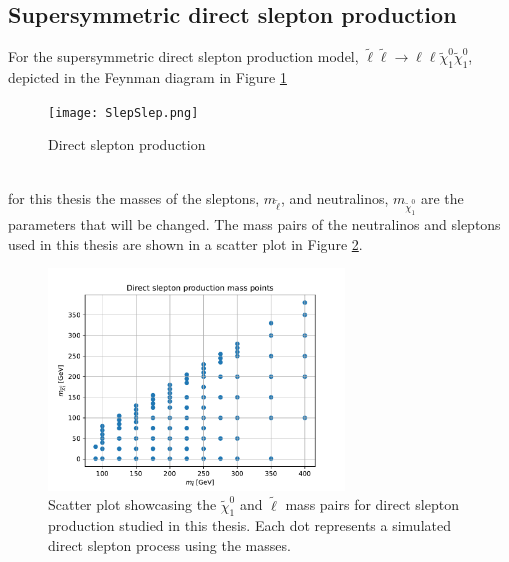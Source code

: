 \documentclass[12pt, a4paper]{book}
\begin{document}
\subsection{Supersymmetric direct slepton production}
For the supersymmetric direct slepton production model, $\tilde{\ell}\tilde{\ell}\rightarrow \ell\ell\tilde{\chi}_1^0\tilde{\chi}_1^0$, depicted in the Feynman diagram in Figure \ref{fig:designer_got_me_slepslep}
\begin{figure}[!h]
    \centering
    \texttt{[image: SlepSlep.png]}
    \caption{Direct slepton production}\label{fig:designer_got_me_slepslep}
\end{figure}
\\for this thesis the masses of the sleptons, $m_{\tilde{\ell}}$, and neutralinos, $m_{\tilde{\chi}_1^0}$ are the parameters that will be changed. 
The mass pairs of the neutralinos and sleptons used in this thesis are shown in a scatter plot in Figure \ref{fig:slepslep_mass}.
\graphicspath{{../../../Plots/2d_masses/}}
\begin{figure}[!ht]
    \centering
    \includegraphics[width=0.7\textwidth]{SlepSlep.pdf}
    \caption[$\tilde{\chi}_1^0$ and $\tilde{\ell}$ mass pairs for direct slepton production]{Scatter plot showcasing the $\tilde{\chi}_1^0$ and $\tilde{\ell}$ mass pairs for direct slepton production studied in this thesis. Each dot represents a simulated direct slepton process using the masses.}\label{fig:slepslep_mass}
\end{figure}
\graphicspath{{../../figures/}}
\end{document}
